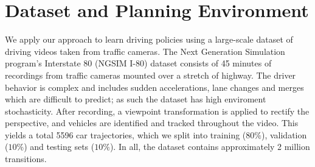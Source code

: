 \documentclass{article} %
\begin{document}










\section{Dataset and Planning Environment}
\label{dataset-and-planning}

We apply our approach to learn driving policies using a large-scale dataset of driving videos taken from traffic cameras.
The Next Generation Simulation program's Interstate 80 (NGSIM I-80) dataset \citep{NGSIM} consists of 45 minutes of recordings from traffic cameras mounted over a stretch of highway.
The driver behavior is complex and includes sudden accelerations, lane changes and merges which are difficult to predict; as such the dataset has high enviroment stochasticity.
After recording, a viewpoint transformation is applied to rectify the perspective, and vehicles are identified and tracked throughout the video.
This yields a total 5596 car trajectories, which we split into training ($80\%$), validation ($10\%$) and testing sets ($10\%$). In all, the dataset contains approximately 2 million transitions. 
\end{document}
